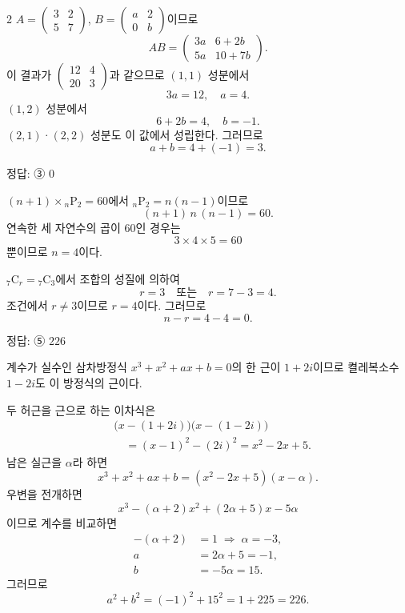 \documentclass[10pt]{article}
\begin{document}
\begin{multicols}{2}
$A = \begin{pmatrix} 3 & 2 \\ 5 & 7 \end{pmatrix}$, $B = \begin{pmatrix} a & 2 \\ 0 & b \end{pmatrix}$이므로
\[ AB = \begin{pmatrix} 3a & 6 + 2b \\ 5a & 10 + 7b \end{pmatrix}. \]
이 결과가 $\begin{pmatrix} 12 & 4 \\ 20 & 3 \end{pmatrix}$과 같으므로 $(1,1)$ 성분에서
\[ 3a = 12,\quad a = 4. \]
$(1,2)$ 성분에서
\[ 6 + 2b = 4,\quad b = -1. \]
$(2,1)$·$(2,2)$ 성분도 이 값에서 성립한다. 그러므로
\[ a + b = 4 + (-1) = 3. \]

\begin{answerbox}정답: ③ $0$\end{answerbox}

$(n+1) \times {}_n\mathrm{P}_2 = 60$에서 ${}_n\mathrm{P}_2 = n(n-1)$이므로
\[ (n+1)\,n\,(n-1) = 60. \]
연속한 세 자연수의 곱이 $60$인 경우는
\[ 3 \times 4 \times 5 = 60 \]
뿐이므로 $n = 4$이다.

${}_7\mathrm{C}_r = {}_7\mathrm{C}_3$에서 조합의 성질에 의하여
\[ r = 3 \quad \text{또는} \quad r = 7 - 3 = 4. \]
조건에서 $r \ne 3$이므로 $r = 4$이다. 그러므로
\[ n - r = 4 - 4 = 0. \]

\begin{answerbox}정답: ⑤ $226$\end{answerbox}

계수가 실수인 삼차방정식 $x^3 + x^2 + ax + b = 0$의 한 근이 $1 + 2i$이므로 켤레복소수 $1 - 2i$도 이 방정식의 근이다.

두 허근을 근으로 하는 이차식은
\begin{align*}
&\bigl(x - (1+2i)\bigr)\bigl(x - (1-2i)\bigr) \\
&\quad = (x-1)^2 - (2i)^2 = x^2 - 2x + 5.
\end{align*}
남은 실근을 $\alpha$라 하면
\[ x^3 + x^2 + ax + b = (x^2 - 2x + 5)(x - \alpha). \]
우변을 전개하면
\[ x^3 - (\alpha + 2)x^2 + (2\alpha + 5)x - 5\alpha \]
이므로 계수를 비교하면
\begin{align*}
-(\alpha + 2) &= 1 \;\Rightarrow\; \alpha = -3, \\
a &= 2\alpha + 5 = -1, \\
b &= -5\alpha = 15.
\end{align*}
그러므로
\[ a^2 + b^2 = (-1)^2 + 15^2 = 1 + 225 = 226. \]


\end{multicols}
\end{document}
